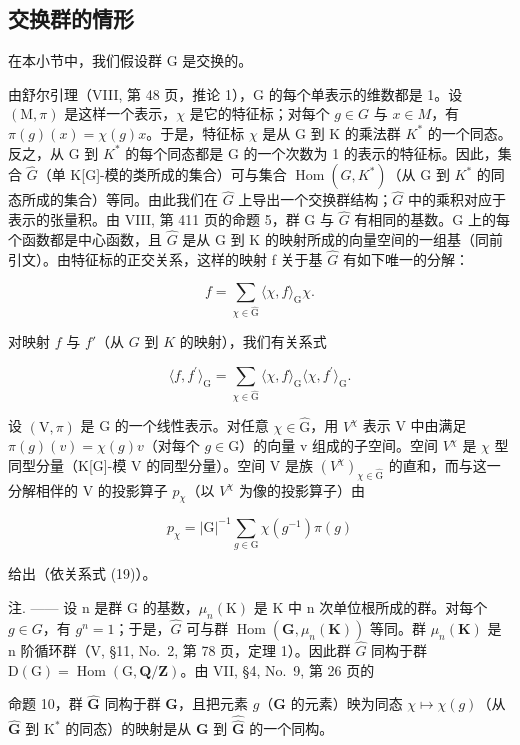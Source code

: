 \subsection{交换群的情形}

在本小节中，我们假设群 \(\mathrm{G}\) 是交换的。

由舒尔引理（VIII, 第 48 页，推论 1），G 的每个单表示的维数都是 1。设 \((\mathrm{M},\pi)\) 是这样一个表示，\(\chi\) 是它的特征标；对每个 \(g\in G\) 与 \(x\in M\)，有 \(\pi(g)(x)=\chi(g)x\)。于是，特征标 \(\chi\) 是从 G 到 K 的乘法群 \(K^{*}\) 的一个同态。反之，从 G 到 \(K^{*}\) 的每个同态都是 G 的一个次数为 1 的表示的特征标。因此，集合 \(\widehat{G}\)（单 K{[}G{]}-模的类所成的集合）可与集合 \(\operatorname{Hom}(G,K^{*})\)（从 G 到 \(K^{*}\) 的同态所成的集合）等同。由此我们在 \(\widehat{G}\) 上导出一个交换群结构；\(\widehat{G}\) 中的乘积对应于表示的张量积。由 VIII, 第 411 页的命题 5，群 G 与 \(\widehat{G}\) 有相同的基数。G 上的每个函数都是中心函数，且 \(\widehat{G}\) 是从 G 到 K 的映射所成的向量空间的一组基（同前引文）。由特征标的正交关系，这样的映射 f 关于基 \(\widehat{G}\) 有如下唯一的分解：

\[
f = \sum_ {\chi \in \widehat {\mathrm{G}}} \langle \chi , f \rangle_ {\mathrm{G}} \chi .\tag{39}
\]

对映射 \(f\) 与 \(f'\)（从 \(G\) 到 \(K\) 的映射），我们有关系式

\[
\langle f, f ^ {\prime} \rangle_ {\mathrm{G}} = \sum_ {\chi \in \widehat {\mathrm{G}}} \langle \chi , f \rangle_ {\mathrm{G}} \langle \chi , f ^ {\prime} \rangle_ {\mathrm{G}}.\tag{40}
\]

设 \((\mathrm{V},\pi)\) 是 G 的一个线性表示。对任意 \(\chi\in\widehat{\mathrm{G}}\)，用 \(V^{\chi}\) 表示 V 中由满足 \(\pi(g)(v)=\chi(g)v\)（对每个 \(g\in\mathrm{G}\)）的向量 v 组成的子空间。空间 \(V^{\chi}\) 是 \(\chi\) 型同型分量（K{[}G{]}-模 V 的同型分量）。空间 V 是族 \((V^{\chi})_{\chi\in\widehat{\mathrm{G}}}\) 的直和，而与这一分解相伴的 V 的投影算子 \(p_{\chi}\)（以 \(V^{\chi}\) 为像的投影算子）由

\[
p _ {\chi} = | \mathrm{G} | ^ {- 1} \sum_ {g \in \mathrm{G}} \chi (g ^ {- 1}) \pi (g)\tag{41}
\]

给出（依关系式 (19)）。

注. —— 设 n 是群 G 的基数，\(\mu_{n}(\mathrm{K})\) 是 K 中 n 次单位根所成的群。对每个 \(g \in G\)，有 \(g^{n} = 1\)；于是，\(\widehat{G}\) 可与群 \(\operatorname{Hom}(\mathbf{G}, \mu_{n}(\mathbf{K}))\) 等同。群 \(\mu_{n}(\mathbf{K})\) 是 n 阶循环群（V, §11, No.~2, 第 78 页，定理 1）。因此群 \(\widehat{G}\) 同构于群 \(\mathrm{D}(\mathrm{G}) = \operatorname{Hom}(\mathrm{G}, \mathbf{Q}/\mathbf{Z})\)。由 VII, §4, No.~9, 第 26 页的

命题 10，群 \(\widehat{\mathbf{G}}\) 同构于群 \(\mathbf{G}\)，且把元素 \(g\)（\(\mathbf{G}\) 的元素）映为同态 \(\chi \mapsto \chi(g)\)（从 \(\widehat{\mathbf{G}}\) 到 \(\mathrm{K}^*\) 的同态）的映射是从 \(\mathbf{G}\) 到 \(\widehat{\widehat{\mathbf{G}}}\) 的一个同构。
\relax{}
